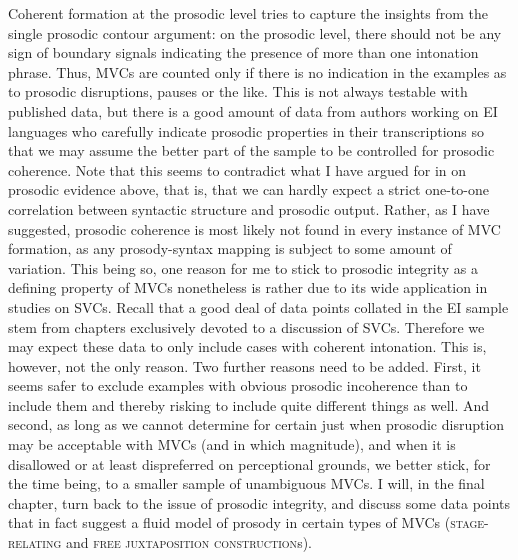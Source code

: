 Coherent formation at the prosodic level tries to capture the insights from the single prosodic contour argument: on the prosodic level, there should not be any sign of boundary signals indicating the presence of more than one intonation phrase. Thus, MVCs are counted only if there is no indication in the examples as to prosodic disruptions, pauses or the like. This is not always testable with published data, but there is a good amount of data from authors working on EI languages who carefully indicate prosodic properties in their transcriptions so that we may assume the better part of the sample to be controlled for prosodic coherence. Note that this seems to contradict what I have argued for in  on prosodic evidence above, that is, that we can hardly expect a strict one-to-one correlation between syntactic structure and prosodic output. Rather, as I have suggested, prosodic coherence is most likely not found in every instance of MVC formation, as any prosody-syntax mapping is subject to some amount of variation. This being so, one reason for me to stick to prosodic integrity as a defining property of MVCs nonetheless is rather due to its wide application in studies on SVCs. Recall that a good deal of data points collated in the EI sample stem from chapters exclusively devoted to a discussion of SVCs. Therefore we may expect these data to only include cases with coherent intonation. This is, however, not the only reason. Two further reasons need to be added. First, it seems safer to exclude examples with obvious prosodic incoherence than to include them and thereby risking to include quite different things as well. And second, as long as we cannot determine for certain just when prosodic disruption may be acceptable with MVCs (and in which magnitude), and when it is disallowed or at least dispreferred on perceptional grounds, we better stick, for the time being, to a smaller sample of unambiguous MVCs. I will, in the final chapter, turn back to the issue of prosodic integrity, and discuss some data points that in fact suggest a fluid model of prosody in certain types of MVCs (\textsc{stage-relating} and \textsc{free juxtaposition construction}s).

